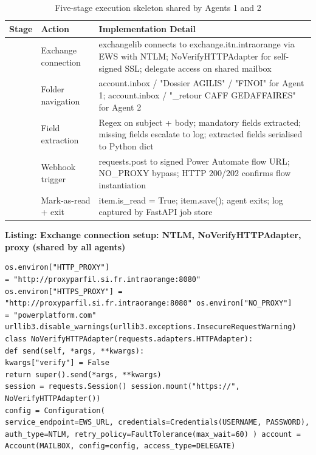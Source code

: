 \begin{table}[H]
  \centering
  \caption{Five-stage execution skeleton shared by Agents 1 and 2}
  \renewcommand{\arraystretch}{1.0}
  \begin{tabularx}{\textwidth}{|>{\raggedright\arraybackslash}p{2.3cm}|X|X|}
    \hline
    \textbf{Stage} & \textbf{Action} & \textbf{Implementation Detail} \\ \hline
    1 & Exchange connection & exchangelib connects to exchange.itn.intraorange via EWS with NTLM; NoVerifyHTTPAdapter for self-signed SSL; delegate access on shared mailbox \\ \hline
    2 & Folder navigation & account.inbox / "Dossier AGILIS" / "FINOI" for Agent 1; account.inbox / "\_retour CAFF GEDAFFAIRES" for Agent 2 \\ \hline
    3 & Field extraction & Regex on subject + body; mandatory fields extracted; missing fields escalate to log; extracted fields serialised to Python dict \\ \hline
    4 & Webhook trigger & requests.post to signed Power Automate flow URL; NO\_PROXY bypass; HTTP 200/202 confirms flow instantiation \\ \hline
    5 & Mark-as-read + exit & item.is\_read = True; item.save(); agent exits; log captured by FastAPI job store \\ \hline
  \end{tabularx}
\end{table}

\begin{center}\small\textbf{Listing: Exchange connection setup: NTLM, NoVerifyHTTPAdapter, proxy (shared by all agents)}\end{center}
\begin{Verbatim}[breaklines=true,fontsize=\footnotesize,frame=single]
os.environ["HTTP_PROXY"]
= "http://proxyparfil.si.fr.intraorange:8080" os.environ["HTTPS_PROXY"] = "http://proxyparfil.si.fr.intraorange:8080" os.environ["NO_PROXY"]	= "powerplatform.com"
urllib3.disable_warnings(urllib3.exceptions.InsecureRequestWarning)
class NoVerifyHTTPAdapter(requests.adapters.HTTPAdapter):
def send(self, *args, **kwargs):
kwargs["verify"] = False
return super().send(*args, **kwargs)
session = requests.Session() session.mount("https://", NoVerifyHTTPAdapter())
config = Configuration(
service_endpoint=EWS_URL, credentials=Credentials(USERNAME, PASSWORD),
auth_type=NTLM, retry_policy=FaultTolerance(max_wait=60) ) account = Account(MAILBOX, config=config, access_type=DELEGATE)
\end{Verbatim}

